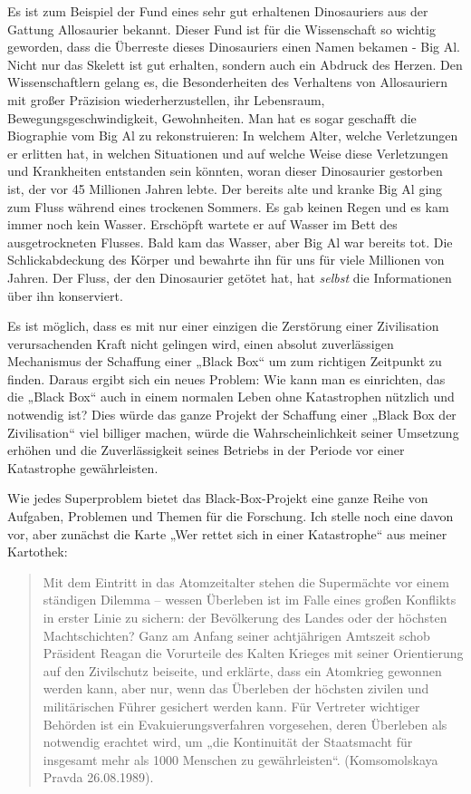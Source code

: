 \documentclass[11pt,a4paper]{article}
\begin{document}
Es ist zum Beispiel der Fund eines sehr gut erhaltenen Dinosauriers aus der
Gattung Allosaurier bekannt.  Dieser Fund ist für die Wissenschaft so wichtig
geworden, dass die Überreste dieses Dinosauriers einen Namen bekamen - Big Al.
Nicht nur das Skelett ist gut erhalten, sondern auch ein Abdruck des
Herzen. Den Wissenschaftlern gelang es, die Besonderheiten des Verhaltens von
Allosauriern mit großer Präzision wiederherzustellen, ihr Lebensraum,
Bewegungsgeschwindigkeit, Gewohnheiten. Man hat es sogar geschafft die
Biographie vom Big Al zu rekonstruieren: In welchem Alter, welche Verletzungen
er erlitten hat, in welchen Situationen und auf welche Weise diese
Verletzungen und Krankheiten entstanden sein könnten, woran dieser Dinosaurier
gestorben ist, der vor 45 Millionen Jahren lebte. Der bereits alte und kranke
Big Al ging zum Fluss während eines trockenen Sommers. Es gab keinen Regen und
es kam immer noch kein Wasser. Erschöpft wartete er auf Wasser im Bett des
ausgetrockneten Flusses. Bald kam das Wasser, aber Big Al war bereits tot.
Die Schlickabdeckung des Körper und bewahrte ihn für uns für viele Millionen
von Jahren. Der Fluss, der den Dinosaurier getötet hat, hat \emph{selbst} die
Informationen über ihn konserviert.

Es ist möglich, dass es mit nur einer einzigen die Zerstörung einer
Zivilisation verursachenden Kraft nicht gelingen wird, einen absolut
zuverlässigen Mechanismus der Schaffung einer „Black Box“ um zum richtigen
Zeitpunkt zu finden. Daraus ergibt sich ein neues Problem: Wie kann man es
einrichten, das die „Black Box“ auch in einem normalen Leben ohne Katastrophen
nützlich und notwendig ist?  Dies würde das ganze Projekt der Schaffung einer
„Black Box der Zivilisation“ viel billiger machen, würde die
Wahrscheinlichkeit seiner Umsetzung erhöhen und die Zuverlässigkeit seines
Betriebs in der Periode vor einer Katastrophe gewährleisten.

Wie jedes Superproblem bietet das Black-Box-Projekt eine ganze Reihe von
Aufgaben, Problemen und Themen für die Forschung. Ich stelle noch eine davon
vor, aber zunächst die Karte „Wer rettet sich in einer Katastrophe“ aus meiner
Kartothek:
\begin{quote}  
  Mit dem Eintritt in das Atomzeitalter stehen die Supermächte vor einem
  ständigen Dilemma -- wessen Überleben ist im Falle eines großen Konflikts in
  erster Linie zu sichern: der Bevölkerung des Landes oder der höchsten
  Machtschichten? Ganz am Anfang seiner achtjährigen Amtszeit schob Präsident
  Reagan die Vorurteile des Kalten Krieges mit seiner Orientierung auf den
  Zivilschutz beiseite, und erklärte, dass ein Atomkrieg gewonnen werden kann,
  aber nur, wenn das Überleben der höchsten zivilen und militärischen Führer
  gesichert werden kann. Für Vertreter wichtiger Behörden ist ein
  Evakuierungsverfahren vorgesehen, deren Überleben als notwendig erachtet
  wird, um „die Kontinuität der Staatsmacht für insgesamt mehr als 1000
  Menschen zu gewährleisten“. (Komsomolskaya Pravda 26.08.1989).
\end{quote}
\end{document}

